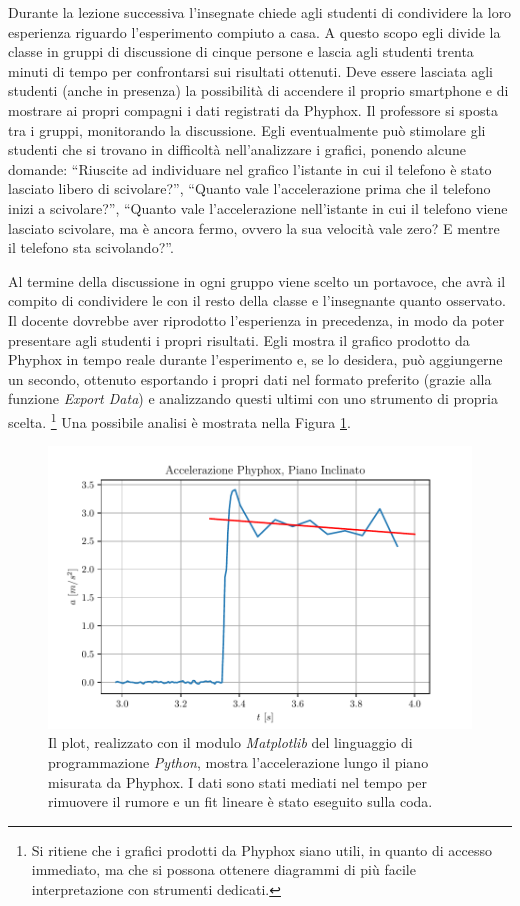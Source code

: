 \documentclass{report} \usepackage[T1]{fontenc} \usepackage[italian]{babel}
\begin{document}
Durante la lezione successiva l'insegnate chiede agli studenti
di condividere la loro esperienza riguardo l'esperimento
compiuto a casa.
A questo scopo egli divide la classe in gruppi di
discussione di cinque persone e lascia agli studenti trenta
minuti di tempo per confrontarsi sui risultati ottenuti.
Deve essere lasciata agli studenti (anche in presenza)
la possibilità di accendere il proprio smartphone e di
mostrare ai propri compagni i dati registrati da
Phyphox.
Il professore si sposta tra i gruppi, monitorando
la discussione.
Egli eventualmente può stimolare gli studenti che si trovano
in difficoltà nell'analizzare i grafici, ponendo
alcune domande: ``Riuscite ad individuare nel grafico l'istante
in cui il telefono è stato lasciato libero di scivolare?'',
``Quanto vale l'accelerazione prima che il telefono inizi a
scivolare?'', ``Quanto vale l'accelerazione nell'istante
in cui il telefono viene lasciato scivolare, ma è ancora fermo,
ovvero la sua velocità vale zero? E mentre il telefono sta
scivolando?''.

Al termine della discussione in ogni gruppo viene scelto
un portavoce, che avrà il compito di condividere le
con il resto della classe e l'insegnante quanto osservato.
Il docente dovrebbe aver riprodotto l'esperienza in precedenza,
in modo da poter presentare agli studenti i propri risultati.
Egli mostra il grafico prodotto da
Phyphox in tempo reale durante l'esperimento e, se lo desidera,
può aggiungerne un secondo, ottenuto
esportando i propri dati nel formato preferito (grazie alla funzione
\emph{Export Data}) e analizzando questi ultimi con uno strumento di propria
scelta.
\footnote{
          Si ritiene che i grafici prodotti da Phyphox siano utili,
          in quanto di accesso immediato, ma che si possona ottenere
          diagrammi di più facile interpretazione con strumenti
          dedicati.
         }
Una possibile analisi è mostrata nella Figura \ref{fig:a_phyphox}.
\begin{figure}[H]
\centering
  \includegraphics[width=\textwidth]{a_phyphox}
  \caption{Il plot, realizzato con il modulo \emph{Matplotlib}
           del linguaggio di programmazione \emph{Python},
           mostra l'accelerazione lungo il piano misurata da
           Phyphox. I dati sono stati mediati nel tempo
           per rimuovere il rumore e un fit lineare è stato
           eseguito sulla coda.
          }
  \label{fig:a_phyphox}
\end{figure}
\end{document}
